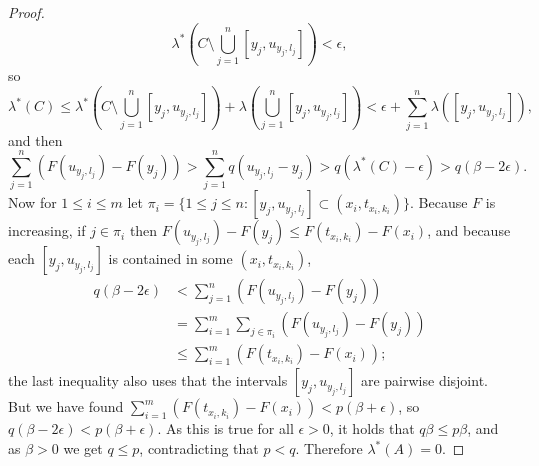 \documentclass{article}
\theoremstyle{definition}
\begin{document}
\begin{proof}
\[
\lambda^*\left( C \setminus \bigcup_{j=1}^n [y_j,u_{y_j,l_j}]\right) < \epsilon,
\]
so
\[
\lambda^*(C) \leq  \lambda^*\left( C \setminus \bigcup_{j=1}^n [y_j,u_{y_j,l_j}]\right)+ \lambda\left( \bigcup_{j=1}^n [y_j,u_{y_j,l_j}]\right) 
<\epsilon+ \sum_{j=1}^n \lambda( [y_j,u_{y_j,l_j}]),
\]
and then
\[
\sum_{j=1}^n (F(u_{y_j,l_j})-F(y_j)) > \sum_{j=1}^n q (u_{y_j,l_j}-y_j)
>q(\lambda^*(C)-\epsilon)
>q(\beta-2\epsilon).
\]
Now for $1 \leq i \leq m$ let $\pi_i = \{1 \leq j \leq n: [y_j,u_{y_j,l_j}] \subset (x_i,t_{x_i,k_i})\}$.
Because $F$ is increasing, if $j \in \pi_i$ then $F(u_{y_j,l_j})-F(y_j) \leq F(t_{x_i,k_i})-F(x_i)$, and because
each $[y_j,u_{y_j,l_j}]$ is contained in some $(x_i,t_{x_i,k_i})$,
\begin{align*}
q(\beta-2\epsilon)&<\sum_{j=1}^n (F(u_{y_j,l_j})-F(y_j))\\
&=\sum_{i=1}^m \sum_{j \in \pi_i}  (F(u_{y_j,l_j})-F(y_j))\\
&\leq\sum_{i=1}^m   (F(t_{x_i,k_i})-F(x_i));
\end{align*}
the last inequality also uses that the intervals $[y_j,u_{y_j,l_j}]$ are pairwise disjoint.
But we have found $\sum_{i=1}^m   (F(t_{x_i,k_i})-F(x_i)) < p(\beta+\epsilon)$, so
$q(\beta-2\epsilon) < p(\beta+\epsilon)$. As this is true for all $\epsilon>0$, it holds that
$q\beta \leq p\beta$, and as $\beta>0$ we get $q \leq p$, contradicting that $p<q$. Therefore $\lambda^*(A)=0$.
\end{proof}
\end{document}
